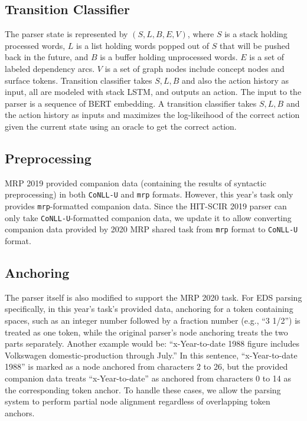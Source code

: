 \documentclass[11pt,a4paper]{article}
\begin{document}
\subsection{Transition Classifier}
The parser state is represented by $(S,L,B,E,V)$, where $S$ is a
stack holding processed words, $L$ is a list holding words popped out of $S$ that will be pushed back in the future, and $B$ is a buffer holding unprocessed words. $E$ is a set of labeled dependency arcs. $V$ is a set of graph nodes include  concept  nodes and surface tokens. Transition classifier takes $S, L, B$ and also the action history as input, all are modeled with stack LSTM, and outputs an action. The input to the parser is a sequence of BERT embedding. A transition classifier takes $S,L,B$ and the action history as inputs and maximizes the log-likeihood of the correct action given the current state using an oracle to get the correct action.

\subsection{Preprocessing}\label{sec:hit-scir-preprocessing}
MRP 2019 provided companion data (containing the results of syntactic preprocessing) in both \texttt{CoNLL-U} and \texttt{mrp} formats. However, this year's task only provides \texttt{mrp}-formatted companion data.
Since the HIT-SCIR 2019 parser can only take \texttt{CoNLL-U}-formatted companion data, we update it to allow converting companion data provided by 2020 MRP shared task from \texttt{mrp} format to \texttt{CoNLL-U} format.

\subsection{Anchoring}\label{sec:hit-scir-anchoring}
The parser itself is also modified to support the MRP 2020 task. For EDS parsing specifically, in this year's task's provided data, anchoring for a token containing spaces, such as an integer number followed by a fraction number (e.g., ``3 1/2'') is treated as one token, while the original parser's node anchoring treats the two parts separately.
Another example would be: ``x-Year-to-date 1988 figure includes Volkswagen domestic-production through July.'' In this sentence, ``x-Year-to-date 1988'' is marked as a node anchored from characters 2 to 26, but the provided companion data treats ``x-Year-to-date'' as anchored from characters 0 to 14 as the corresponding token anchor. To handle these cases, we allow the parsing system to perform partial node alignment regardless of overlapping token anchors.
\end{document}
